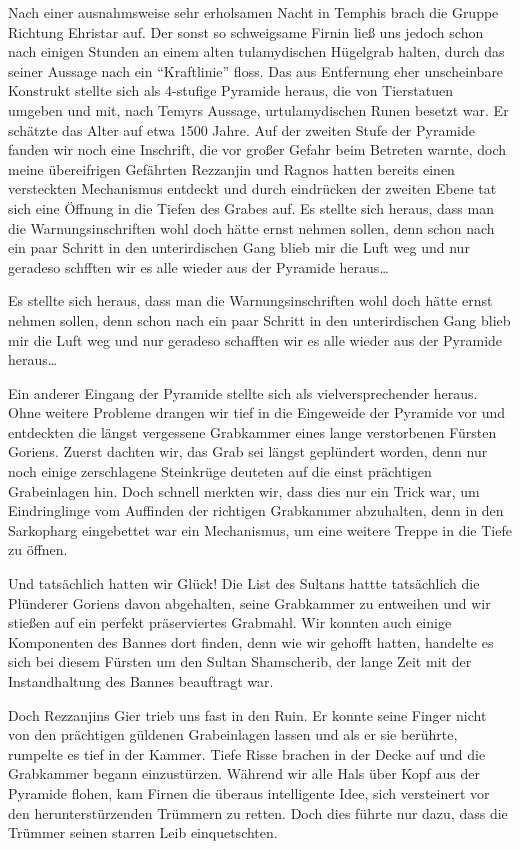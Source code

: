 Nach einer ausnahmsweise sehr erholsamen Nacht in Temphis brach die Gruppe Richtung Ehristar auf. Der sonst so schweigsame Firnin ließ uns jedoch schon nach einigen Stunden an einem alten tulamydischen Hügelgrab halten, durch das seiner Aussage nach ein ``Kraftlinie'' floss. Das aus Entfernung eher unscheinbare Konstrukt stellte sich als 4-stufige Pyramide heraus, die von Tierstatuen umgeben und mit, nach Temyrs Aussage, urtulamydischen Runen besetzt war. Er schätzte das Alter auf etwa 1500 Jahre. Auf der zweiten Stufe der Pyramide fanden wir noch eine Inschrift, die vor großer Gefahr beim Betreten warnte, doch meine übereifrigen Gefährten Rezzanjin und Ragnos hatten bereits einen versteckten Mechanismus entdeckt und durch eindrücken der zweiten Ebene tat sich eine Öffnung in die Tiefen des Grabes auf. Es stellte sich heraus, dass man die Warnungsinschriften wohl doch hätte ernst nehmen sollen, denn schon nach ein paar Schritt in den unterirdischen Gang blieb mir die Luft weg und nur geradeso schfften wir es alle wieder aus der Pyramide heraus\dots

Es stellte sich heraus, dass man die Warnungsinschriften wohl doch hätte ernst nehmen sollen, denn schon nach ein paar Schritt in den unterirdischen Gang blieb mir die Luft weg und nur geradeso schafften wir es alle wieder aus der Pyramide heraus\dots

Ein anderer Eingang der Pyramide stellte sich als vielversprechender heraus. Ohne weitere Probleme drangen wir tief in die Eingeweide der Pyramide vor und entdeckten die längst vergessene Grabkammer eines lange verstorbenen Fürsten Goriens. Zuerst dachten wir, das Grab sei längst geplündert worden, denn nur noch einige zerschlagene Steinkrüge deuteten auf die einst prächtigen Grabeinlagen hin. Doch schnell merkten wir, dass dies nur ein Trick war, um Eindringlinge vom Auffinden der richtigen Grabkammer abzuhalten, denn in den Sarkopharg eingebettet war ein Mechanismus, um eine weitere Treppe in die Tiefe zu öffnen.

Und tatsächlich hatten wir Glück! Die List des Sultans hattte tatsächlich die Plünderer Goriens davon abgehalten, seine Grabkammer zu entweihen und wir stießen auf ein perfekt präserviertes Grabmahl. Wir konnten auch einige Komponenten des Bannes dort finden, denn wie wir gehofft hatten, handelte es sich bei diesem Fürsten um den Sultan Shamscherib, der lange Zeit mit der Instandhaltung des Bannes beauftragt war.

Doch Rezzanjins Gier trieb uns fast in den Ruin. Er konnte seine Finger nicht von den prächtigen güldenen Grabeinlagen lassen und als er sie berührte, rumpelte es tief in der Kammer. Tiefe Risse brachen in der Decke auf und die Grabkammer begann einzustürzen. Während wir alle Hals über Kopf aus der Pyramide flohen, kam Firnen die überaus intelligente Idee, sich versteinert vor den herunterstürzenden Trümmern zu retten. Doch dies führte nur dazu, dass die Trümmer seinen starren Leib einquetschten.

